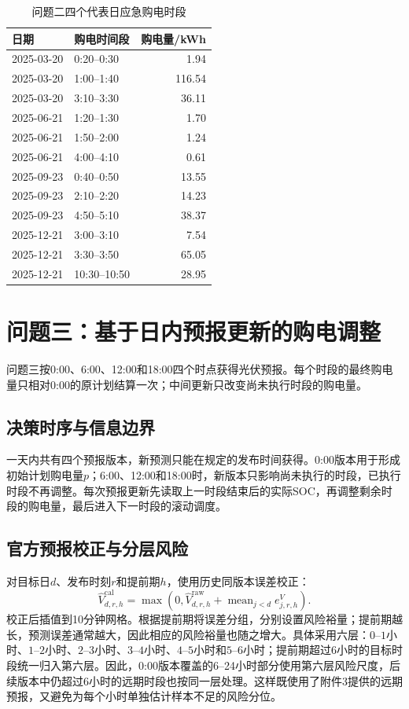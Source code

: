 \documentclass[UTF8,12pt,a4paper]{ctexart}
\theoremstyle{remark}
\begin{document}
\begin{table}[H]\centering\scriptsize
\caption{问题二四个代表日应急购电时段}\label{tab:q2-emergency}
\begin{tabular}{llr}\toprule 日期&购电时间段&购电量/kWh\\\midrule
2025-03-20&0:20--0:30&1.94\\
2025-03-20&1:00--1:40&116.54\\
2025-03-20&3:10--3:30&36.11\\
2025-06-21&1:20--1:30&1.70\\
2025-06-21&1:50--2:00&1.24\\
2025-06-21&4:00--4:10&0.61\\
2025-09-23&0:40--0:50&13.55\\
2025-09-23&2:10--2:20&14.23\\
2025-09-23&4:50--5:10&38.37\\
2025-12-21&3:00--3:10&7.54\\
2025-12-21&3:30--3:50&65.05\\
2025-12-21&10:30--10:50&28.95\\\bottomrule\end{tabular}\end{table}

\section{问题三：基于日内预报更新的购电调整}
问题三按0:00、6:00、12:00和18:00四个时点获得光伏预报。每个时段的最终购电量只相对0:00的原计划结算一次；中间更新只改变尚未执行时段的购电量。
\subsection{决策时序与信息边界}
一天内共有四个预报版本，新预测只能在规定的发布时间获得。0:00版本用于形成初始计划购电量$p$；6:00、12:00和18:00时，新版本只影响尚未执行的时段，已执行时段不再调整。每次预报更新先读取上一时段结束后的实际SOC，再调整剩余时段的购电量，最后进入下一时段的滚动调度。
\subsection{官方预报校正与分层风险}
对目标日$d$、发布时刻$r$和提前期$h$，使用历史同版本误差校正：
\begin{equation}\widehat V^{\mathrm{cal}}_{d,r,h}=\max\left(0,\widehat V^{\mathrm{raw}}_{d,r,h}+\operatorname{mean}_{j<d}e^V_{j,r,h}\right).\label{eq:q3-calibrate}\end{equation}
校正后插值到10分钟网格。根据提前期将误差分组，分别设置风险裕量；提前期越长，预测误差通常越大，因此相应的风险裕量也随之增大。具体采用六层：$0$--$1$小时、$1$--$2$小时、$2$--$3$小时、$3$--$4$小时、$4$--$5$小时和$5$--$6$小时；提前期超过$6$小时的目标时段统一归入第六层。因此，0:00版本覆盖的6--24小时部分使用第六层风险尺度，后续版本中仍超过6小时的远期时段也按同一层处理。这样既使用了附件3提供的远期预报，又避免为每个小时单独估计样本不足的风险分位。
\end{document}
